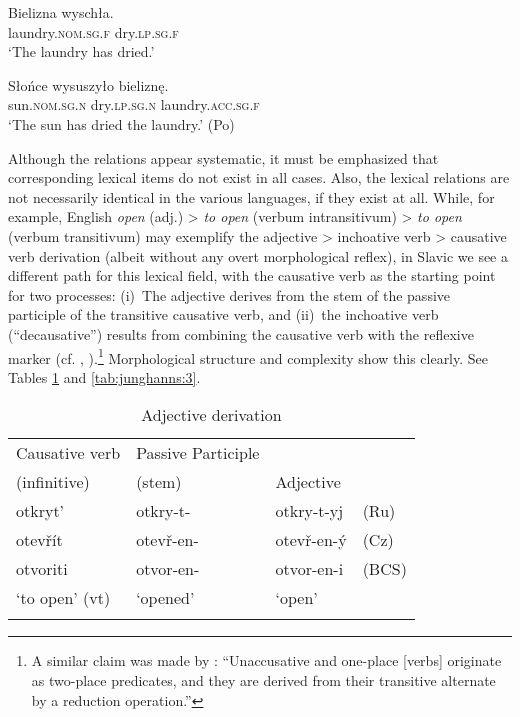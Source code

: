 \documentclass[output=paper]{langscibook}
\begin{document}
  \ex \gll   Bielizna wyschła.\\
    laundry.\textsc{nom.sg.f} dry.\textsc{lp.sg.f}\\
    \glt ‘The laundry has dried.’

  \ex \gll   Słońce wysuszyło bieliznę.\\
    sun.\textsc{nom.sg.n} dry.\textsc{lp.sg.n} laundry.\textsc{acc.sg.f}\\
    \glt ‘The sun has dried the laundry.’ \hfill (Po)
\z
\z

\noindent Although the relations appear systematic, it must be emphasized that corresponding lexical items do not exist in all cases. Also, the lexical relations are not necessarily identical in the various languages, if they exist at all. While, for example, English \textit{open} (adj.) > \textit{to open} (verbum intransitivum) > \textit{to open} (verbum transitivum) may exemplify the adjective > inchoative verb > causative verb derivation (albeit without any overt morphological reflex), in Slavic we see a different path for this lexical field, with the causative verb as the starting point for two processes: (i)~The adjective derives from the stem of the passive participle of the transitive causative verb, and (ii)~the inchoative verb (“decausative”) results from combining the causative verb with the reflexive marker (cf. \cite[174]{Paduceva2003}, \cite[292]{Fehrmannetal2014}).\footnote{A similar claim was made by \citet[9]{Reinhart2016}: “Unaccusative and one-place [verbs] originate as two-place predicates, and they are derived from their transitive alternate by a reduction operation.”} Morphological structure and complexity show this clearly. See Tables \ref{tab:junghanns:2} and \ref{tab:junghanns:3}.


\begin{table}[h]
\begin{tabular}{llll}
\lsptoprule
Causative verb & Passive Participle & \\
 (infinitive) & (stem) & {Adjective} & \\
\midrule
 otkryt’ & otkry-t- & otkry-t-yj &  (Ru)\\
 otevřít & otevř-en- & otevř-en-ý &  (Cz)\\
 otvoriti & otvor-en- & otvor-en-i & (BCS)\\
 ‘to open’ (vt) & ‘opened’ & ‘open’ & \\
\lspbottomrule
\end{tabular}
\caption{Adjective derivation}
\label{tab:junghanns:2}
\end{table}
\end{document}
